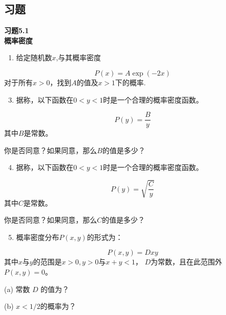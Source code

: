 \documentclass[UTF8]{ctexart}
\numberwithin{equation}{section}%
\numberwithin{figure}{section}%
\begin{document}
    \subsection{习题}
    \noindent \textbf{习题5.1}\label{prob5.1}\\
    \textbf{概率密度}\\
    \begin{enumerate}
      \item 给定随机数$x$,与其概率密度
    \end{enumerate}
    $$
    P(x)=A \exp (-2 x)
    $$
    对于所有$x>0$，找到$A$的值及$x>1$下的概率.
    
    \begin{enumerate}
      \setcounter{enumi}{2}
      \item 据称，以下函数在$0<y<1$时是一个合理的概率密度函数。
    \end{enumerate}
    $$
    P(y)=\frac{B}{y}
    $$
    其中$B$是常数。
    
    你是否同意？如果同意，那么$B$的值是多少？
   
    \begin{enumerate}
      \setcounter{enumi}{3}
      \item 据称，以下函数在$0<y<1$时是一个合理的概率密度函数。
    \end{enumerate}
    $$
    P(y)=\sqrt{\frac{C}{y}}
    $$
    其中$C$是常数。
    
    你是否同意？如果同意，那么$C$的值是多少？
    
    \begin{enumerate}
      \setcounter{enumi}{4}
      \item 概率密度分布$P(x, y)$的形式为：
    \end{enumerate}
    $$
    P(x, y)=D x y
    $$
    其中$x$与$y$的范围是$x>0, y>0$与$x+y<1$， $D$为常数，且在此范围外$P(x, y)=0$。
    
    (a) 常数 $D$ 的值为？
    
    (b) $x<1 / 2$的概率为？
    
\end{document}
